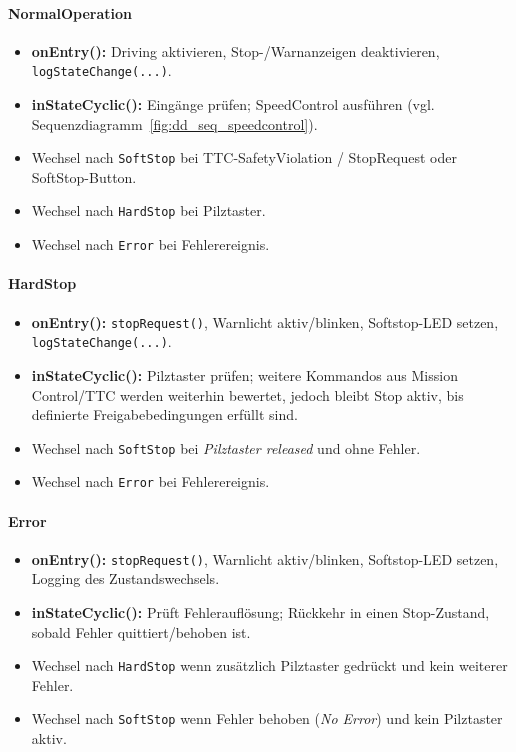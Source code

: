\paragraph{NormalOperation}
\begin{itemize}[leftmargin=*, itemsep=2pt]
  \item \textbf{onEntry():} Driving aktivieren, Stop-/Warnanzeigen deaktivieren,\\ \texttt{logStateChange(...)}.
  \item \textbf{inStateCyclic():} Eingänge prüfen; SpeedControl ausführen (vgl. Sequenzdiagramm~\ref{fig:dd_seq_speedcontrol}).
  \item Wechsel nach \texttt{SoftStop} bei TTC-SafetyViolation / StopRequest oder SoftStop-Button.
  \item Wechsel nach \texttt{HardStop} bei Pilztaster.
  \item Wechsel nach \texttt{Error} bei Fehlerereignis.
\end{itemize}

\paragraph{HardStop}
\begin{itemize}[leftmargin=*, itemsep=2pt]
  \item \textbf{onEntry():} \texttt{stopRequest()}, Warnlicht aktiv/blinken, Softstop-LED setzen,\\ \texttt{logStateChange(...)}.
  \item \textbf{inStateCyclic():} Pilztaster prüfen; weitere Kommandos aus Mission Control/TTC werden weiterhin bewertet,
        jedoch bleibt Stop aktiv, bis definierte Freigabebedingungen erfüllt sind.
  \item Wechsel nach \texttt{SoftStop} bei \emph{Pilztaster released} und ohne Fehler.
  \item Wechsel nach \texttt{Error} bei Fehlerereignis.
\end{itemize}

\paragraph{Error}
\begin{itemize}[leftmargin=*, itemsep=2pt]
  \item \textbf{onEntry():} \texttt{stopRequest()}, Warnlicht aktiv/blinken, Softstop-LED setzen, Logging des Zustandswechsels.
  \item \textbf{inStateCyclic():} Prüft Fehlerauflösung; Rückkehr in einen Stop-Zustand, sobald Fehler quittiert/behoben ist.
  \item Wechsel nach \texttt{HardStop} wenn zusätzlich Pilztaster gedrückt und kein weiterer Fehler.
  \item Wechsel nach \texttt{SoftStop} wenn Fehler behoben (\emph{No Error}) und kein Pilztaster aktiv.
\end{itemize}

